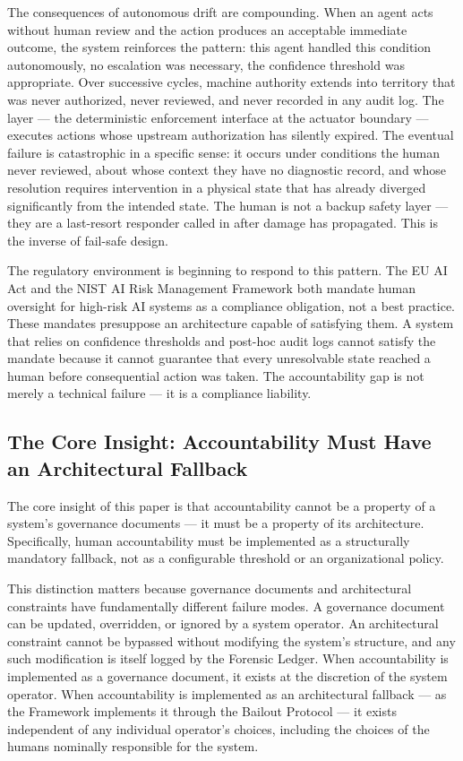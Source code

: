 The consequences of autonomous drift are compounding. When an agent acts without human review and the action produces an acceptable immediate outcome, the system reinforces the pattern: this agent handled this condition autonomously, no escalation was necessary, the confidence threshold was appropriate. Over successive cycles, machine authority extends into territory that was never authorized, never reviewed, and never recorded in any audit log. The \fact layer — the deterministic enforcement interface at the actuator boundary — executes actions whose upstream authorization has silently expired. The eventual failure is catastrophic in a specific sense: it occurs under conditions the human never reviewed, about whose context they have no diagnostic record, and whose resolution requires intervention in a physical state that has already diverged significantly from the intended state. The human is not a backup safety layer — they are a last-resort responder called in after damage has propagated. This is the inverse of fail-safe design.

The regulatory environment is beginning to respond to this pattern. The EU AI Act and the NIST AI Risk Management Framework both mandate human oversight for high-risk AI systems as a compliance obligation, not a best practice. These mandates presuppose an architecture capable of satisfying them. A system that relies on confidence thresholds and post-hoc audit logs cannot satisfy the mandate because it cannot guarantee that every unresolvable state reached a human before consequential action was taken. The accountability gap is not merely a technical failure — it is a compliance liability.

\subsection{The Core Insight: Accountability Must Have an Architectural Fallback}

The core insight of this paper is that accountability cannot be a property of a system's governance documents — it must be a property of its architecture. Specifically, human accountability must be implemented as a structurally mandatory fallback, not as a configurable threshold or an organizational policy.

This distinction matters because governance documents and architectural constraints have fundamentally different failure modes. A governance document can be updated, overridden, or ignored by a system operator. An architectural constraint cannot be bypassed without modifying the system's structure, and any such modification is itself logged by the Forensic Ledger. When accountability is implemented as a governance document, it exists at the discretion of the system operator. When accountability is implemented as an architectural fallback — as the \bxthree Framework implements it through the Bailout Protocol — it exists independent of any individual operator's choices, including the choices of the humans nominally responsible for the system.


